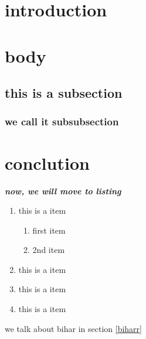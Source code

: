 \documentclass{article}
\begin{document}
\huge
\section{introduction}
\section{body}
\subsection{this is a subsection}
\huge
\subsubsection*{we call it subsubsection}
\section{conclution}



\textit{\textbf{now, we will move to listing}}
\begin{enumerate}
    \item this is a item
    \begin{enumerate}
        \item first item
        \item 2nd item
    \end{enumerate}
    \item this is a item
    \item this is a item
    \item this is a item
\end{enumerate}

\pagebreak
we talk about bihar in section \ref{biharr}
\end{document}
